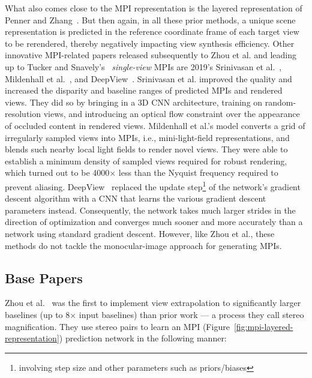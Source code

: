 What also comes close to the MPI representation is the layered representation of Penner and Zhang~\cite{penner_soft_2017}. But then again, in all these prior methods, a unique scene representation is predicted in the reference coordinate frame of each target view to be rerendered, thereby negatively impacting view synthesis efficiency. Other innovative MPI-related papers released subsequently to Zhou et al. and leading up to Tucker and Snavely's~\cite{single_view_mpi} \textit{single-view} MPIs are 2019's Srinivasan et al.~\cite{srinivasan_pushing_2019}, Mildenhall et al.~\cite{mildenhall_local_2019}, and DeepView~\cite{flynn_deepview_2019}. Srinivasan et al. improved the quality and increased the disparity and baseline ranges of predicted MPIs and rendered views. They did so by bringing in a 3D CNN architecture, training on random-resolution views, and introducing an optical flow constraint over the appearance of occluded content in rendered views. Mildenhall et al.'s model converts a grid of irregularly sampled views into MPIs, i.e., mini-light-field representations, and blends such nearby local light fields to render novel views. They were able to establish a minimum density of sampled views required for robust rendering, which turned out to be 4000$\times$ less than the Nyquist frequency required to prevent aliasing. DeepView~\cite{flynn_deepview_2019} replaced the update step\footnote{involving step size and other parameters such as priors/biases} of the network's gradient descent algorithm with a CNN that learns the various gradient descent parameters instead. Consequently, the network takes much larger strides in the direction of optimization and converges much sooner and more accurately than a network using standard gradient descent. However, like Zhou et al., these methods do not tackle the monocular-image approach for generating MPIs.

\subsection{Base Papers}\label{subsec:base-papers}

Zhou et al.~\cite{zhou2018stereo} was the first to implement view extrapolation to significantly larger baselines (up to 8$\times$ input baselines) than prior work --- a process they call stereo magnification. They use stereo pairs to learn an MPI (Figure~\ref{fig:mpi-layered-representation}) prediction network in the following manner:

